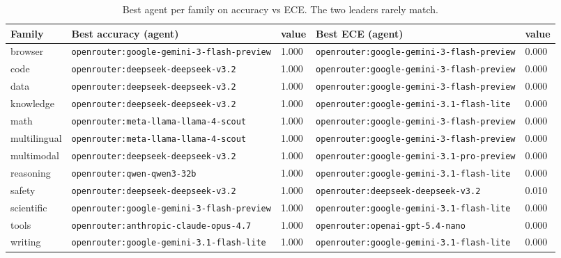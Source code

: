 \begin{table}[t]\centering\small
\caption{Best agent per family on accuracy vs ECE. The two leaders rarely match.}\label{tab:per-family-winners}
\begin{tabular}{lllll}
\toprule
Family & Best accuracy (agent) & value & Best ECE (agent) & value \\
\midrule
browser & \texttt{openrouter:google-gemini-3-flash-preview} & 1.000 & \texttt{openrouter:google-gemini-3-flash-preview} & 0.000 \\
code & \texttt{openrouter:deepseek-deepseek-v3.2} & 1.000 & \texttt{openrouter:google-gemini-3-flash-preview} & 0.000 \\
data & \texttt{openrouter:deepseek-deepseek-v3.2} & 1.000 & \texttt{openrouter:google-gemini-3-flash-preview} & 0.000 \\
knowledge & \texttt{openrouter:deepseek-deepseek-v3.2} & 1.000 & \texttt{openrouter:google-gemini-3.1-flash-lite} & 0.000 \\
math & \texttt{openrouter:meta-llama-llama-4-scout} & 1.000 & \texttt{openrouter:google-gemini-3-flash-preview} & 0.000 \\
multilingual & \texttt{openrouter:meta-llama-llama-4-scout} & 1.000 & \texttt{openrouter:google-gemini-3-flash-preview} & 0.000 \\
multimodal & \texttt{openrouter:deepseek-deepseek-v3.2} & 1.000 & \texttt{openrouter:google-gemini-3.1-pro-preview} & 0.000 \\
reasoning & \texttt{openrouter:qwen-qwen3-32b} & 1.000 & \texttt{openrouter:google-gemini-3.1-flash-lite} & 0.000 \\
safety & \texttt{openrouter:deepseek-deepseek-v3.2} & 1.000 & \texttt{openrouter:deepseek-deepseek-v3.2} & 0.010 \\
scientific & \texttt{openrouter:google-gemini-3-flash-preview} & 1.000 & \texttt{openrouter:google-gemini-3.1-flash-lite} & 0.000 \\
tools & \texttt{openrouter:anthropic-claude-opus-4.7} & 1.000 & \texttt{openrouter:openai-gpt-5.4-nano} & 0.000 \\
writing & \texttt{openrouter:google-gemini-3.1-flash-lite} & 1.000 & \texttt{openrouter:google-gemini-3.1-flash-lite} & 0.000 \\
\bottomrule
\end{tabular}
\end{table}